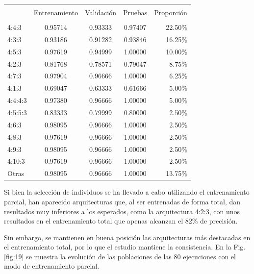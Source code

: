 \documentclass[spanish,a4paper,12pt,twoside]{report}
\begin{document}
  \begin{center}
   \label{table}
  \begin{tabular}{l c c c r}
    \hline \\ [-2ex]
    & Entrenamiento & Validación & Pruebas & Proporción \\ [0.5ex]
    \hline \\ [-1ex]
    4:4:3 & 0.95714 & 0.93333 & 0.97407 & 22.50\% \\
    4:3:3 & 0.93186 & 0.91282 & 0.93846 & 16.25\% \\ 
    4:5:3 & 0.97619 & 0.94999 & 1.00000 & 10.00\% \\
    4:2:3 & 0.81768 & 0.78571 & 0.79047 & 8.75\% \\
    4:7:3 & 0.97904 & 0.96666 & 1.00000 & 6.25\% \\ 
    4:1:3 & 0.69047 & 0.63333 & 0.61666 & 5.00\% \\
    4:4:4:3 & 0.97380 & 0.96666 & 1.00000 & 5.00\% \\
    4:5:5:3 & 0.83333 & 0.79999 & 0.80000 & 2.50\% \\
    4:6:3 & 0.98095 & 0.96666 & 1.00000 & 2.50\% \\
    4:8:3 & 0.97619 & 0.96666 & 1.00000 & 2.50\% \\ 
    4:9:3 & 0.98095 & 0.96666 & 1.00000 & 2.50\% \\
    4:10:3 & 0.97619 & 0.96666 & 1.00000 & 2.50\% \\ 
    Otras & 0.98095 & 0.96666 & 1.00000 & 13.75\% \\ [1ex]
    \hline
  \end{tabular}
\end{center} \par
  Si bien la selección de individuos se ha llevado a cabo utilizando el entrenamiento parcial, han aparecido arquitecturas que, al ser entrenadas de forma total, dan resultados muy inferiores a los esperados, como la arquitectura 4:2:3, con unos resultados en el entrenamiento total que apenas alcanzan el 82\% de precisión. \par
  Sin embargo, se mantienen en buena posición las arquitecturas más destacadas en el entrenamiento total, por lo que el estudio mantiene la consistencia. En la Fig. \ref{fig:19} se muestra la evolución de las poblaciones de las 80 ejecuciones con el modo de entrenamiento parcial.
\end{document}
